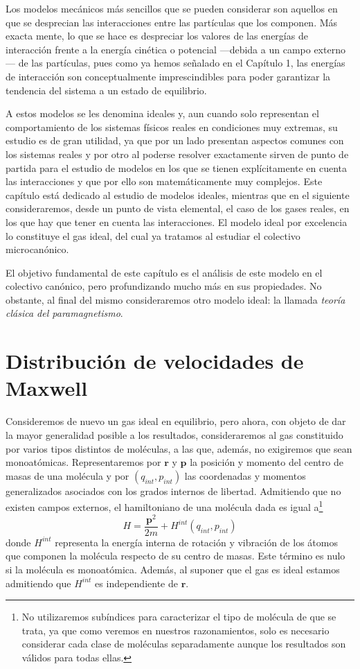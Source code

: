 Los modelos mecánicos más sencillos que se pueden considerar son aquellos en que se desprecian las interacciones entre las partículas que los componen.
Más exacta mente, lo que se hace es despreciar los valores de las energías de interacción frente a la energía cinética o potencial ---debida a un campo externo--- de las partículas, pues como ya hemos señalado en el Capítulo 1, las energías de interacción son conceptualmente imprescindibles para poder garantizar la tendencia del sistema a un estado de equilibrio.

A estos modelos se les denomina ideales y, aun cuando solo representan el comportamiento de los sistemas físicos reales en condiciones muy extremas, su estudio es de gran utilidad, ya que por un lado presentan aspectos comunes con los sistemas reales y por otro al poderse resolver exactamente sirven de punto de partida para el estudio de modelos en los que se tienen explícitamente en cuenta las interacciones y que por ello son matemáticamente muy complejos.
Este capítulo está dedicado al estudio de modelos ideales, mientras que en el siguiente consideraremos, desde un punto de vista elemental, el caso de los gases reales, en los que hay que tener en cuenta las interacciones.
El modelo ideal por excelencia lo constituye el gas ideal, del cual ya tratamos al estudiar el colectivo microcanónico. 

El objetivo fundamental de este capítulo es el análisis de este modelo en el colectivo canónico, pero profundizando mucho más en sus propiedades. 
No obstante, al final del mismo consideraremos otro modelo ideal: la llamada \emph{teoría clásica del paramagnetismo}.

\newpage

\section{Distribución de velocidades de Maxwell}

Consideremos de nuevo un gas ideal en equilibrio, pero ahora, con objeto de dar la mayor generalidad posible a los resultados, consideraremos al gas constituido por varios tipos distintos de moléculas, a las que, además, no exigiremos que sean monoatómicas.
Representaremos por $\mathbf{r}$ y $\mathbf{p}$ la posición y momento del centro de masas de una molécula y por $(q_{int}, p_{int})$ las coordenadas y momentos generalizados asociados con los grados internos de libertad. Admitiendo que no existen campos externos, el hamiltoniano de una molécula dada es igual a\footnote{No utilizaremos subíndices para caracterizar el tipo de molécula de que se trata, ya que como veremos en nuestros razonamientos, solo es necesario considerar cada clase de moléculas separadamente aunque los resultados son válidos para todas ellas.}
\begin{equation}
	H = \frac{\mathbf{p}^2}{2m} + H^{int}(q_{int}, p_{int})
\end{equation}
donde $H^{int}$ representa la energía interna de rotación y vibración de los átomos que componen la molécula respecto de su centro de masas.
Este término es nulo si la molécula es monoatómica.
Además, al suponer que el gas es ideal estamos admitiendo que $H^{int}$ es independiente de $\mathbf{r}$.


